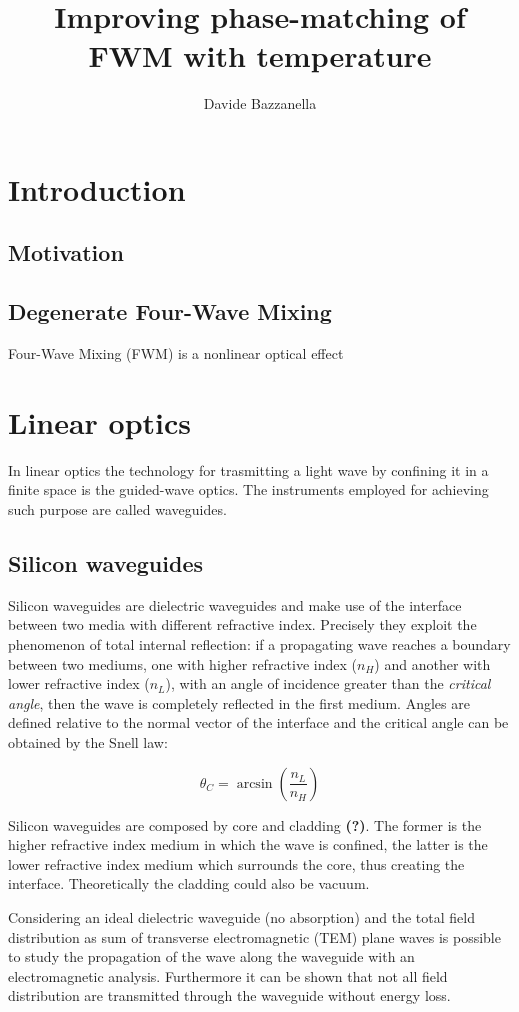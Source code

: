 \documentclass[12pt,a4paper]{article}
\author{Davide Bazzanella}
\title{Improving phase-matching of FWM with temperature}
\begin{document}

\newpage
\section{Introduction}
\subsection{Motivation}
\subsection{Degenerate Four-Wave Mixing}
Four-Wave Mixing (FWM) is a nonlinear optical effect

\section{Linear optics}
In linear optics the technology for trasmitting a light wave by confining it in a finite space is the guided-wave optics.
The instruments employed for achieving such purpose are called waveguides.
\subsection{Silicon waveguides}
Silicon waveguides are dielectric waveguides and make use of the interface between two media with different refractive index.
Precisely they exploit the phenomenon of total internal reflection: if a propagating wave reaches a boundary between two mediums, one with higher refractive index ($n_H$) and another with lower refractive index ($n_L$), with an angle of incidence greater than the \textit{critical angle}, then the wave is completely reflected in the first medium.
Angles are defined relative to the normal vector of the interface and the critical angle can be obtained by the Snell law:

$$	\theta_C = \arcsin \left( \frac{n_L}{n_H} \right)$$

Silicon waveguides are composed by core and cladding \textbf{(?)}. %
The former is the higher refractive index medium in which the wave is confined, the latter is the lower refractive index medium which surrounds the core, thus creating the interface. Theoretically the cladding could also be vacuum.

Considering an ideal dielectric waveguide (no absorption) and the total field distribution as sum of transverse electromagnetic (TEM) plane waves is possible to study the propagation of the wave along the waveguide with an electromagnetic analysis.
Furthermore it can be shown that not all field distribution are transmitted through the waveguide without energy loss.
\end{document}
